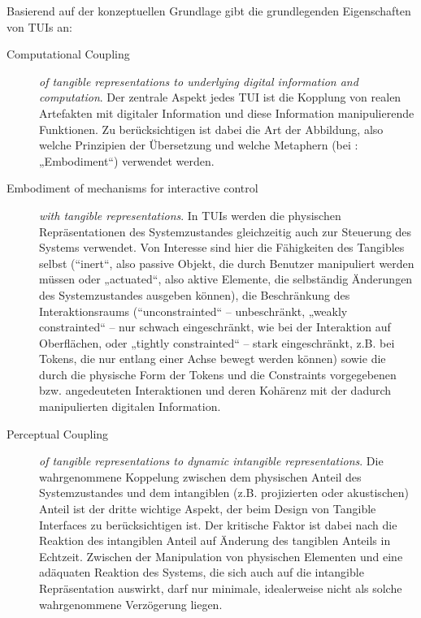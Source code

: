 Basierend auf der konzeptuellen Grundlage gibt \citeauthor{Ishii08} die grundlegenden Eigenschaften von \glspl{TUI} an:
\begin{description}
	\item[Computational Coupling] \emph{of tangible representations to underlying digital information and computation}. Der zentrale Aspekt jedes \gls{TUI} ist die Kopplung von realen Artefakten mit digitaler Information und diese Information manipulierende Funktionen. Zu berücksichtigen ist dabei die Art der Abbildung, also welche Prinzipien der Übersetzung und welche Metaphern (bei \citeauthor{Ishii08}: „Embodiment“) verwendet werden.
	\item[Embodiment of mechanisms for interactive control] \emph{with tangible representations}. In \glspl{TUI} werden die physischen Repräsentationen des Systemzustandes gleichzeitig auch zur Steuerung des Systems verwendet. Von Interesse sind hier die Fähigkeiten des Tangibles selbst (“inert“, also passive Objekt, die durch Benutzer manipuliert werden müssen oder „actuated“, also aktive Elemente, die selbständig Änderungen des Systemzustandes ausgeben können), die Beschränkung des Interaktionsraums (“unconstrainted“ -- unbeschränkt, „weakly constrainted“ -- nur schwach eingeschränkt, wie bei der Interaktion auf Oberflächen, oder „tightly constrainted“ -- stark eingeschränkt, z.B. bei Tokens, die nur entlang einer Achse bewegt werden können) sowie die durch die physische Form der Tokens und die Constraints vorgegebenen bzw. angedeuteten Interaktionen und deren Kohärenz mit der dadurch manipulierten digitalen Information.
	\item[Perceptual Coupling] \emph{of tangible representations to dynamic intangible representations}. Die wahrgenommene Koppelung zwischen dem physischen Anteil des Systemzustandes und dem intangiblen (z.B. projizierten oder akustischen) Anteil ist der dritte wichtige Aspekt, der beim Design von Tangible Interfaces zu berücksichtigen ist. Der kritische Faktor ist dabei nach \citeauthor{Ishii08} die Reaktion des intangiblen Anteil auf Änderung des tangiblen Anteils in Echtzeit. Zwischen der Manipulation von physischen Elementen und eine adäquaten Reaktion des Systems, die sich auch auf die intangible Repräsentation auswirkt, darf nur minimale, idealerweise nicht als solche wahrgenommene Verzögerung liegen. 
\end{description}

